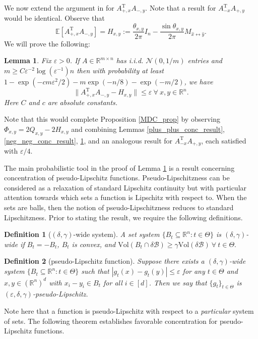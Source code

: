 \documentclass[11pt]{article}
\newcommand{\R}{\mathbb{R}}
\newcommand{\N}{\mathcal{N}}
\newcommand{\T}{\mathrm{T}}
\renewcommand{\epsilon}{\varepsilon}
\newcommand{\E}{\mathbb{E}}
\newtheorem{lemma}{Lemma}
\newtheorem{definition}{Definition}
\begin{document}
We now extend the argument in \cite{Daskalaskisetal2020} for $A_{+,x}^{\T}A_{-,y}$. Note that a result for  $A_{-x}^{\T}A_{+,y}$ would be identical. Observe that $$\E[A_{+,x}^{\T}A_{-,y}] = H_{x,y}:= \frac{\theta_{x,y}}{2\pi}I_n - \frac{\sin \theta_{x,y}}{2\pi}M_{\hat{x}\leftrightarrow \hat{y}}.$$
We will prove the following: \begin{lemma} \label{Daskalaskis_extension}
Fix $\epsilon > 0$. If $A \in \R^{m \times n}$ has i.i.d. $\N(0,1/m)$ entries and $m \geqslant C\epsilon^{-2}\log(\epsilon^{-1})n$ then with probability at least $1 - \exp(-cm\epsilon^2/2) - m\exp(-n/8) - \exp(-m/2)$, we have $$\|A_{+,x}^{\T}A_{-,y} - H_{x,y}\|\leqslant \epsilon\ \forall\ x,y \in \R^n.$$ Here $C$ and $c$ are absolute constants.
\end{lemma} \noindent Note that this would complete Proposition \ref{MDC_prop} by observing $\Phi_{x,y} = 2Q_{x,y} - 2H_{x,y}$ and combining Lemmas \ref{plus_plus_conc_result}, \ref{neg_neg_conc_result}, \ref{Daskalaskis_extension}, and an analogous result for $A_{-x}^{\T}A_{+,y}$, each satisfied with $\epsilon/4$.

The main probabilistic tool in the proof of Lemma \ref{Daskalaskis_extension} is a result concerning concentration of pseudo-Lipschitz functions. Pseudo-Lipschitzness can be considered as a relaxation of standard Lipschitz continuity but with particular attention towards which sets a function is Lipschitz with respect to. When the sets are balls, then the notion of pseudo-Lipschitzness reduces to standard Lipschitzness. Prior to stating the result, we require the following definitions.
\begin{definition}[$(\delta,\gamma)$-wide system]
A set system $\{B_t \subseteq \R^n : t \in \Theta\}$ is $(\delta,\gamma)$-wide if $B_t = -B_t$, $B_t$ is convex, and $\text{Vol}(B_t \cap \delta \mathcal{B}) \geqslant \gamma \text{Vol}(\delta \mathcal{B})\ \forall\ t \in \Theta.$
\end{definition}
\begin{definition}[pseudo-Lipschitz function] Suppose there exists a $(\delta,\gamma)$-wide system $\{B_t \subseteq \R^n : t \in \Theta\}$ such that $|g_t(x) - g_t(y) |\leqslant \epsilon$ for any $t \in \Theta$ and $x,y \in (\R^n)^d$ with $x_i - y_i \in B_t$ for all $i \in [d]$. Then we say that $\{g_t\}_{t \in \Theta}$ is $(\epsilon,\delta,\gamma)$-pseudo-Lipschitz.

\end{definition}

\noindent Note here that a function is pseudo-Lipschitz with respect to a \textit{particular} system of sets. The following theorem establishes favorable concentration for pseudo-Lipschitz functions.
\end{document}
